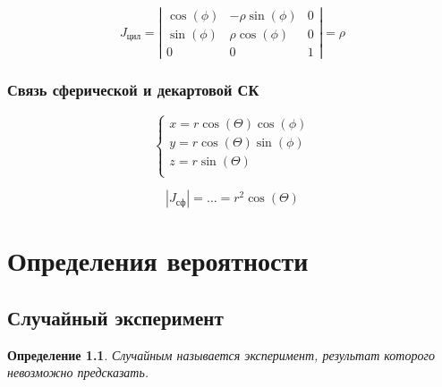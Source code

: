 \documentclass[a4paper, 14pt]{report}
\newtheorem{defenition}{Определение}[chapter]
\begin{document}
    $$
    J_\text{цил} = \left|
    \begin{matrix}
        \cos(\phi) & -\rho \sin(\phi) & 0 \\
        \sin(\phi) & \rho \cos(\phi) & 0 \\
        0 & 0 & 1
    \end{matrix}
    \right| = \rho
    $$

    \subsection{Связь сферической и декартовой СК}

    $$
    \begin{cases}
        x = r \cos(\Theta) \cos(\phi) \\
        y = r \cos(\Theta) \sin(\phi) \\
        z = r \sin(\Theta) \\
    \end{cases}
    $$

    $$
    |J_\text{сф}| = \dots = r^2 \cos(\Theta)
    $$

    \chapter{Определения вероятности}

    \section{Случайный эксперимент}

    \begin{defenition}
        Случайным называется эксперимент, результат которого невозможно предсказать.
    \end{defenition}
\end{document}
